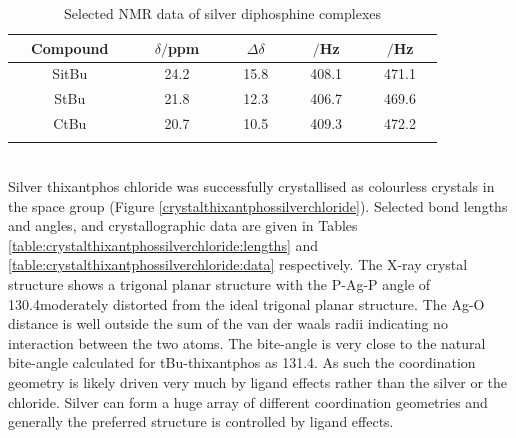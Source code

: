 \begin{table}[h]
\caption[Selected NMR data of silver diphosphine complexes]{Selected NMR data of silver diphosphine complexes} 
\vspace{1em}
\label{table:silverchlorides}
\small
\begin{center}
\begin{tabular}{ c c c c c}
	\toprule{}
	~~Compound~~&~~$\delta$\phosphorus{}$/$ppm~~&~~$\Delta\delta$~~&~~\JAgPseven{}$/$Hz~~&~~\JAgPnine{}$/$Hz~~\\
	\midrule{}
	~~SitBu~~&~~24.2~~&~~15.8~~&~~408.1~~&~~471.1~~\\
	~~StBu~~&~~21.8~~&~~12.3~~&~~406.7~~&~~469.6~~\\
	~~CtBu~~&~~20.7~~&~~10.5~~&~~409.3~~&~~472.2~~\\
	\bottomrule{}
\end{tabular}
\end{center}
\end{table}

\\
Silver thixantphos chloride was successfully crystallised as colourless crystals in the  space group (Figure \ref{crystalthixantphossilverchloride}).  Selected bond lengths and angles, and crystallographic data are given in Tables \ref{table:crystalthixantphossilverchloride:lengths} and \ref{table:crystalthixantphossilverchloride:data} respectively.  The X-ray crystal structure shows a trigonal planar structure with the P-Ag-P angle of 130.4\degrees moderately distorted from the ideal trigonal planar structure.  The Ag-O distance is well outside the sum of the van der waals radii indicating no interaction between the two atoms.  The bite-angle is very close to the natural bite-angle calculated for tBu-thixantphos as 131.4\degrees.  As such the coordination geometry is likely driven very much by ligand effects rather than the silver or the chloride.  Silver can form a huge array of different coordination geometries and generally the preferred structure is controlled by ligand effects.

